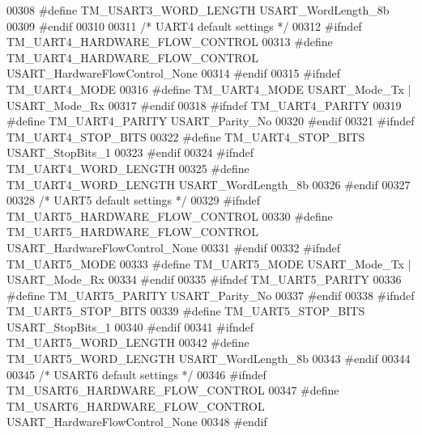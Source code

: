 \begin{DoxyCode}
00308 \textcolor{preprocessor}{#define TM\_USART3\_WORD\_LENGTH               USART\_WordLength\_8b}
00309 \textcolor{preprocessor}{#endif}
00310 
00311 \textcolor{comment}{/* UART4 default settings */}
00312 \textcolor{preprocessor}{#ifndef TM\_UART4\_HARDWARE\_FLOW\_CONTROL}
00313 \textcolor{preprocessor}{#define TM\_UART4\_HARDWARE\_FLOW\_CONTROL      USART\_HardwareFlowControl\_None}
00314 \textcolor{preprocessor}{#endif}
00315 \textcolor{preprocessor}{#ifndef TM\_UART4\_MODE}
00316 \textcolor{preprocessor}{#define TM\_UART4\_MODE                       USART\_Mode\_Tx | USART\_Mode\_Rx}
00317 \textcolor{preprocessor}{#endif}
00318 \textcolor{preprocessor}{#ifndef TM\_UART4\_PARITY}
00319 \textcolor{preprocessor}{#define TM\_UART4\_PARITY                     USART\_Parity\_No}
00320 \textcolor{preprocessor}{#endif}
00321 \textcolor{preprocessor}{#ifndef TM\_UART4\_STOP\_BITS}
00322 \textcolor{preprocessor}{#define TM\_UART4\_STOP\_BITS                  USART\_StopBits\_1}
00323 \textcolor{preprocessor}{#endif}
00324 \textcolor{preprocessor}{#ifndef TM\_UART4\_WORD\_LENGTH}
00325 \textcolor{preprocessor}{#define TM\_UART4\_WORD\_LENGTH                USART\_WordLength\_8b}
00326 \textcolor{preprocessor}{#endif}
00327 
00328 \textcolor{comment}{/* UART5 default settings */}
00329 \textcolor{preprocessor}{#ifndef TM\_UART5\_HARDWARE\_FLOW\_CONTROL}
00330 \textcolor{preprocessor}{#define TM\_UART5\_HARDWARE\_FLOW\_CONTROL      USART\_HardwareFlowControl\_None}
00331 \textcolor{preprocessor}{#endif}
00332 \textcolor{preprocessor}{#ifndef TM\_UART5\_MODE}
00333 \textcolor{preprocessor}{#define TM\_UART5\_MODE                       USART\_Mode\_Tx | USART\_Mode\_Rx}
00334 \textcolor{preprocessor}{#endif}
00335 \textcolor{preprocessor}{#ifndef TM\_UART5\_PARITY}
00336 \textcolor{preprocessor}{#define TM\_UART5\_PARITY                     USART\_Parity\_No}
00337 \textcolor{preprocessor}{#endif}
00338 \textcolor{preprocessor}{#ifndef TM\_UART5\_STOP\_BITS}
00339 \textcolor{preprocessor}{#define TM\_UART5\_STOP\_BITS                  USART\_StopBits\_1}
00340 \textcolor{preprocessor}{#endif}
00341 \textcolor{preprocessor}{#ifndef TM\_UART5\_WORD\_LENGTH}
00342 \textcolor{preprocessor}{#define TM\_UART5\_WORD\_LENGTH                USART\_WordLength\_8b}
00343 \textcolor{preprocessor}{#endif}
00344 
00345 \textcolor{comment}{/* USART6 default settings */}
00346 \textcolor{preprocessor}{#ifndef TM\_USART6\_HARDWARE\_FLOW\_CONTROL}
00347 \textcolor{preprocessor}{#define TM\_USART6\_HARDWARE\_FLOW\_CONTROL     USART\_HardwareFlowControl\_None}
00348 \textcolor{preprocessor}{#endif}

\end{DoxyCode}
